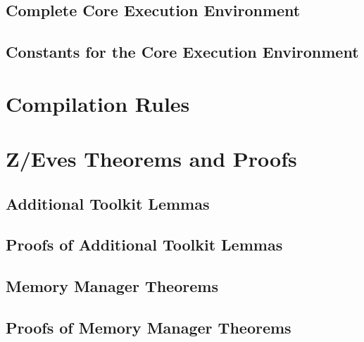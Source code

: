 \documentclass[a4paper,10pt]{report}
\begin{document}
\section{Complete Core Execution Environment}


\section{Constants for the Core Execution Environment}
\label{constants-appendix}



\chapter{Compilation Rules}


\chapter{Z/Eves Theorems and Proofs}
\label{zeves-proofs}

\section{Additional Toolkit Lemmas}
\label{additional-lemmas}
\normalsize

 

\section{Proofs of Additional Toolkit Lemmas}
\label{additional-lemmas-proofs}
\scriptsize





\section{Memory Manager Theorems}
\label{memory-manager-theorems}
\normalsize



\section{Proofs of Memory Manager Theorems}
\label{memory-manager-proofs}
\scriptsize


\end{document}
